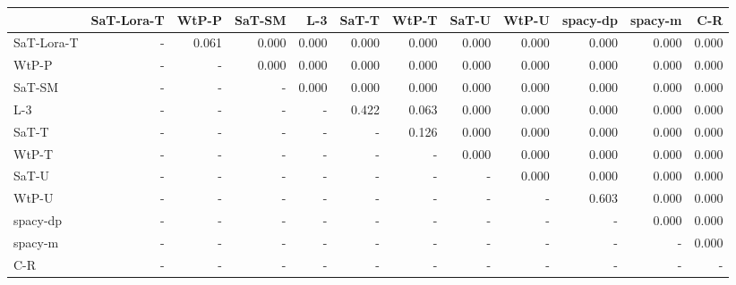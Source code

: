 \begin{tabular}{lrrrrrrrrrrr}
\toprule
 & SaT-Lora-T & WtP-P & SaT-SM & L-3 & SaT-T & WtP-T & SaT-U & WtP-U & spacy-dp & spacy-m & C-R \\
\midrule
SaT-Lora-T & - & 0.061 & 0.000 & 0.000 & 0.000 & 0.000 & 0.000 & 0.000 & 0.000 & 0.000 & 0.000 \\
WtP-P & - & - & 0.000 & 0.000 & 0.000 & 0.000 & 0.000 & 0.000 & 0.000 & 0.000 & 0.000 \\
SaT-SM & - & - & - & 0.000 & 0.000 & 0.000 & 0.000 & 0.000 & 0.000 & 0.000 & 0.000 \\
L-3 & - & - & - & - & 0.422 & 0.063 & 0.000 & 0.000 & 0.000 & 0.000 & 0.000 \\
SaT-T & - & - & - & - & - & 0.126 & 0.000 & 0.000 & 0.000 & 0.000 & 0.000 \\
WtP-T & - & - & - & - & - & - & 0.000 & 0.000 & 0.000 & 0.000 & 0.000 \\
SaT-U & - & - & - & - & - & - & - & 0.000 & 0.000 & 0.000 & 0.000 \\
WtP-U & - & - & - & - & - & - & - & - & 0.603 & 0.000 & 0.000 \\
spacy-dp & - & - & - & - & - & - & - & - & - & 0.000 & 0.000 \\
spacy-m & - & - & - & - & - & - & - & - & - & - & 0.000 \\
C-R & - & - & - & - & - & - & - & - & - & - & - \\
\bottomrule
\end{tabular}

